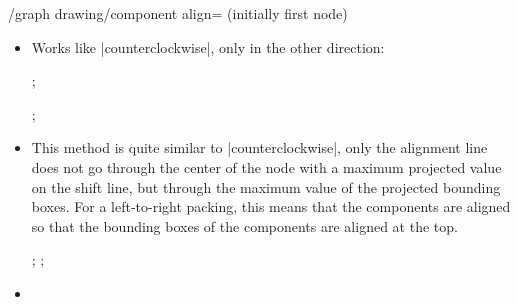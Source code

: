 {\begin{key}{/graph drawing/component align= (initially first node)}
\begin{itemize}
    As for |center|, we project the nodes of the component onto the
    shift line. The alignment line is now chosen so that it goes
    through the center of the node whose center has the highest
    projected value.
\begin{codeexample}[]
\tikz {};
\end{codeexample}
\begin{codeexample}[]
\tikz {};
\end{codeexample}
    The name |counterclockwise| is intended to indicate that the align
    line goes through the node that comes last if we go from the
    alignment direction in a counter-clockwise direction.
  \item {}
    
    Works like |counterclockwise|, only in the other direction:
\begin{codeexample}[]
\tikz {};
\end{codeexample}
\begin{codeexample}[]
\tikz {};
\end{codeexample}
  \item {}

    This method is quite similar to |counterclockwise|, only the
    alignment line does not go through the center of the node with a
    maximum projected value on the shift line, but through the maximum
    value of the projected bounding boxes. For a left-to-right
    packing, this means that the components are aligned so that the
    bounding boxes of the components are aligned at the top.
\begin{codeexample}[]
\tikz {};
\tikz {};
\end{codeexample}
  \item {}
    

\end{itemize}
\end{key}}
